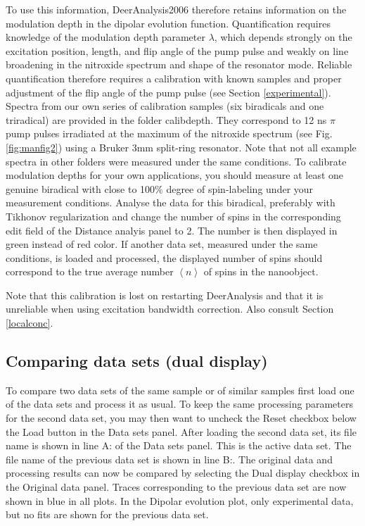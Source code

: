 \documentclass{article}
\begin{document}
To use this information, DeerAnalysis2006
therefore retains information on the modulation depth in the dipolar evolution function. Quantification requires knowledge of the modulation depth parameter $\lambda$, which depends strongly on the excitation position, length, and flip angle of the pump pulse and weakly on line broadening
in the nitroxide spectrum and shape of the resonator mode. Reliable
quantification therefore requires a calibration with known samples and proper
adjustment of the flip angle of the pump pulse (see Section \ref{experimental}). Spectra from our own
series of calibration samples (six biradicals and one triradical) are provided in
the folder calibdepth. They correspond to 12 ns $\pi$ pump pulses irradiated at the
maximum of the nitroxide spectrum (see Fig. \ref{fig:manfig2}) using a Bruker 3mm split-ring
resonator. Note that not all example spectra in other folders were measured
under the same conditions. To calibrate modulation depths for your own applications,
you should measure at least one genuine biradical with close to 100\%
degree of spin-labeling under your measurement conditions. Analyse the data for this biradical, preferably with Tikhonov regularization and change the number of spins in the corresponding edit field of the {\ttfamily Distance analyis} panel to 2. The number is then displayed in green instead of red color. If another data set, measured under the same conditions, is loaded and processed, the displayed number of spins should correspond to the true average number $\left\langle n \right\rangle$ of spins in the nanoobject.

Note that this calibration is lost on restarting DeerAnalysis and that it is unreliable when using excitation bandwidth correction. Also consult Section \ref{localconc}.

\subsection{Comparing data sets (dual display)}
\label{dual_display}
To compare two data sets of the same sample or of similar samples first load one of the data sets and process it as usual. To keep the same processing parameters for the second data set, you may then want to uncheck the {\ttfamily Reset} checkbox below the {\ttfamily Load} button in the {\ttfamily Data sets} panel. After loading the second data set, its file name is shown in line {\ttfamily A:} of the {\ttfamily Data sets} panel. This is the active data set. The file name of the previous data set is shown in line {\ttfamily B:}. The original data and processing results can now be compared by selecting the {\ttfamily Dual display} checkbox in the {\ttfamily Original data} panel. Traces corresponding to the previous data set are now shown in blue in all plots. In the {\ttfamily Dipolar evolution} plot, only experimental data, but no fits are shown for the previous data set.
\end{document}
